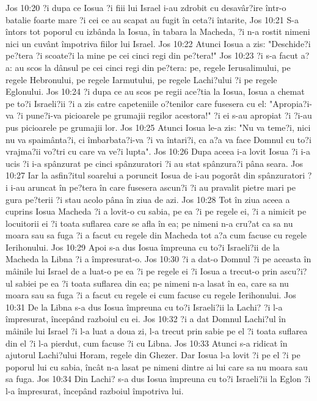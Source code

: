 Jos 10:20  ?i dupa ce Iosua ?i fiii lui Israel i-au zdrobit cu desavâr?ire într-o batalie foarte mare ?i cei ce au scapat au fugit în ceta?i întarite,
Jos 10:21  S-a întors tot poporul cu izbânda la Iosua, în tabara la Macheda, ?i n-a rostit nimeni nici un cuvânt împotriva fiilor lui Israel.
Jos 10:22  Atunci Iosua a zis: "Deschide?i pe?tera ?i scoate?i la mine pe cei cinci regi din pe?tera!"
Jos 10:23  ?i s-a facut a?a: au scos la dânsul pe cei cinci regi din pe?tera: pe, regele Ierusalimului, pe regele Hebronului, pe regele Iarmutului, pe regele Lachi?ului ?i pe regele Eglonului.
Jos 10:24  ?i dupa ce au scos pe regii ace?tia la Iosua, Iosua a chemat pe to?i Israeli?ii ?i a zis catre capeteniile o?tenilor care fusesera cu el: "Apropia?i-va ?i pune?i-va picioarele pe grumajii regilor acestora!" ?i ei s-au apropiat ?i ?i-au pus picioarele pe grumajii lor.
Jos 10:25  Atunci Iosua le-a zis: "Nu va teme?i, nici nu va spaimânta?i, ci îmbarbata?i-va ?i va întari?i, ca a?a va face Domnul cu to?i vrajma?ii vo?tri cu care va ve?i lupta".
Jos 10:26  Dupa aceea i-a lovit Iosua ?i i-a ucis ?i i-a spânzurat pe cinci spânzuratori ?i au stat spânzura?i pâna seara.
Jos 10:27  Iar la asfin?itul soarelui a poruncit Iosua de i-au pogorât din spânzuratori ?i i-au aruncat în pe?tera în care fusesera ascun?i ?i au pravalit pietre mari pe gura pe?terii ?i stau acolo pâna în ziua de azi.
Jos 10:28  Tot în ziua aceea a cuprins Iosua Macheda ?i a lovit-o cu sabia, pe ea ?i pe regele ei, ?i a nimicit pe locuitorii ei ?i toata suflarea care se afla în ea; pe nimeni n-a cru?at ca sa nu moara sau sa fuga ?i a facut cu regele din Macheda tot a?a cum facuse cu regele Ierihonului.
Jos 10:29  Apoi s-a dus Iosua împreuna cu to?i Israeli?ii de la Macheda la Libna ?i a împresurat-o.
Jos 10:30  ?i a dat-o Domnul ?i pe aceasta în mâinile lui Israel de a luat-o pe ea ?i pe regele ei ?i Iosua a trecut-o prin ascu?i?ul sabiei pe ea ?i toata suflarea din ea; pe nimeni n-a lasat în ea, care sa nu moara sau sa fuga ?i a facut cu regele ei cum facuse cu regele Ierihonului.
Jos 10:31  De la Libna s-a dus Iosua împreuna cu to?i Israeli?ii la Lachi? ?i l-a împresurat, începând razboiul cu ei.
Jos 10:32  ?i a dat Domnul Lachi?ul în mâinile lui Israel ?i l-a luat a doua zi, l-a trecut prin sabie pe el ?i toata suflarea din el ?i l-a pierdut, cum facuse ?i cu Libna.
Jos 10:33  Atunci s-a ridicat în ajutorul Lachi?ului Horam, regele din Ghezer. Dar Iosua l-a lovit ?i pe el ?i pe poporul lui cu sabia, încât n-a lasat pe nimeni dintre ai lui care sa nu moara sau sa fuga.
Jos 10:34  Din Lachi? s-a dus Iosua împreuna cu to?i Israeli?ii la Eglon ?i l-a împresurat, începând razboiul împotriva lui.
